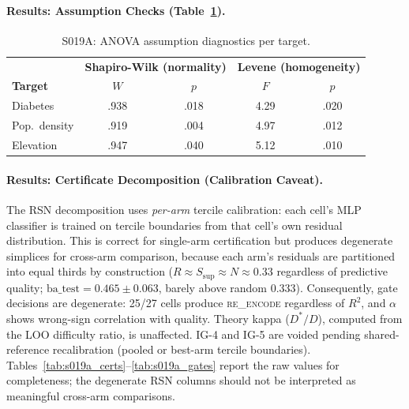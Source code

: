\documentclass{article}
\begin{document}
\paragraph{Results: Assumption Checks (Table~\ref{tab:s019a_assumptions}).}

\begin{table}[htbp]
\centering
\small
\caption{S019A: ANOVA assumption diagnostics per target.}
\label{tab:s019a_assumptions}
\begin{tabular}{l|cc|cc}
\toprule
& \multicolumn{2}{c|}{\textbf{Shapiro-Wilk (normality)}} & \multicolumn{2}{c}{\textbf{Levene (homogeneity)}} \\
\textbf{Target} & $W$ & $p$ & $F$ & $p$ \\
\midrule
Diabetes       & .938 & .018 & 4.29 & .020 \\
Pop.\ density  & .919 & .004 & 4.97 & .012 \\
Elevation      & .947 & .040 & 5.12 & .010 \\
\bottomrule
\end{tabular}
\end{table}


\paragraph{Results: Certificate Decomposition (Calibration Caveat).}
\label{sec:calibration_caveat}
The RSN decomposition uses \emph{per-arm} tercile calibration: each cell's MLP classifier is trained on tercile boundaries from that cell's own residual distribution. This is correct for single-arm certification but produces degenerate simplices for cross-arm comparison, because each arm's residuals are partitioned into equal thirds by construction ($R \approx S_{\text{sup}} \approx N \approx 0.33$ regardless of predictive quality; $\text{ba\_test} = 0.465 \pm 0.063$, barely above random $0.333$). Consequently, gate decisions are degenerate: 25/27 cells produce \textsc{re\_encode} regardless of $R^2$, and $\alpha$ shows wrong-sign correlation with quality. Theory kappa ($D^*/D$), computed from the LOO difficulty ratio, is unaffected. IG-4 and IG-5 are voided pending shared-reference recalibration (pooled or best-arm tercile boundaries). Tables~\ref{tab:s019a_certs}--\ref{tab:s019a_gates} report the raw values for completeness; the degenerate RSN columns should not be interpreted as meaningful cross-arm comparisons.
\end{document}
